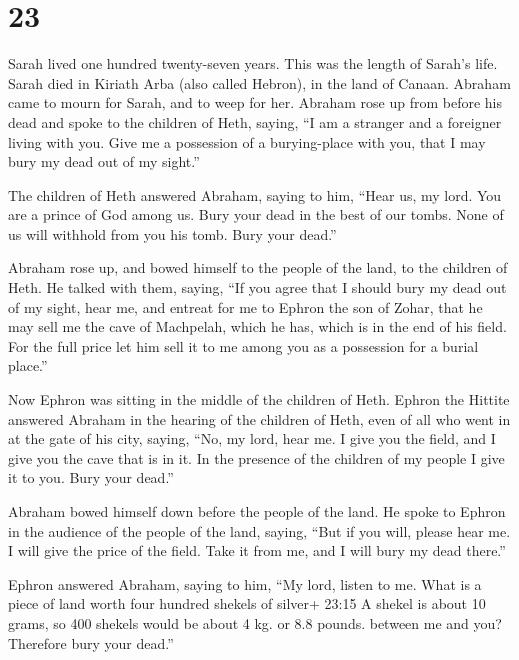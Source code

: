 \hypertarget{section-22}{%
\section{23}\label{section-22}}

 Sarah lived one hundred twenty-seven years. This was the
length of Sarah's life.  Sarah died in Kiriath Arba (also
called Hebron), in the land of Canaan. Abraham came to mourn for Sarah,
and to weep for her.  Abraham rose up from before his dead
and spoke to the children of Heth, saying,  ``I am a
stranger and a foreigner living with you. Give me a possession of a
burying-place with you, that I may bury my dead out of my sight.''

 The children of Heth answered Abraham, saying to him,
 ``Hear us, my lord. You are a prince of God among us. Bury
your dead in the best of our tombs. None of us will withhold from you
his tomb. Bury your dead.''

 Abraham rose up, and bowed himself to the people of the
land, to the children of Heth.  He talked with them, saying,
``If you agree that I should bury my dead out of my sight, hear me, and
entreat for me to Ephron the son of Zohar,  that he may sell
me the cave of Machpelah, which he has, which is in the end of his
field. For the full price let him sell it to me among you as a
possession for a burial place.''

 Now Ephron was sitting in the middle of the children of
Heth. Ephron the Hittite answered Abraham in the hearing of the children
of Heth, even of all who went in at the gate of his city, saying,
 ``No, my lord, hear me. I give you the field, and I give
you the cave that is in it. In the presence of the children of my people
I give it to you. Bury your dead.''

 Abraham bowed himself down before the people of the land.
 He spoke to Ephron in the audience of the people of the
land, saying, ``But if you will, please hear me. I will give the price
of the field. Take it from me, and I will bury my dead there.''

 Ephron answered Abraham, saying to him,  ``My
lord, listen to me. What is a piece of land worth four hundred shekels
of silver+ 23:15 A shekel is about 10 grams, so 400 shekels would be
about 4 kg. or 8.8 pounds. between me and you? Therefore bury your
dead.''

